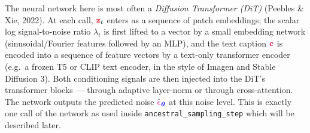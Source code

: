 \documentclass[usenames,dvipsnames]{article}
\newcommand{\myvec}[1]{\mathbf{#1}}
\newcommand{\myvecsym}[1]{\boldsymbol{#1}}
\newcommand{\vz}{\myvec{\textcolor{Red}{z}}}
\newcommand{\vc}{\myvec{\textcolor{purple}{c}}}
\newcommand{\vtheta}{\myvecsym{\textcolor{blue}{\theta}}}
\newcommand{\vepsilon}{\myvecsym{\textcolor{CarnationPink}{\epsilon}}}
\begin{document}
The neural network here is most often a \emph{Diffusion Transformer (DiT)} (Peebles \& Xie, 2022). At each call, $\vz_t$ enters as a sequence of patch embeddings; the scalar log signal-to-noise ratio $\lambda_t$ is first lifted to a vector by a small embedding network (sinusoidal/Fourier features followed by an MLP), and the text caption $\vc$ is encoded into a sequence of feature vectors by a text-only transformer encoder (e.g.\ a frozen T5 or CLIP text encoder, in the style of Imagen and Stable Diffusion 3). Both conditioning signals are then injected into the DiT's transformer blocks --- through adaptive layer-norm or through cross-attention. The network outputs the predicted noise $\hat{\vepsilon}_{\vtheta}$ at this noise level. This is exactly one call of the network as used inside \texttt{ancestral\_sampling\_step} which will be described later.
\end{document}
